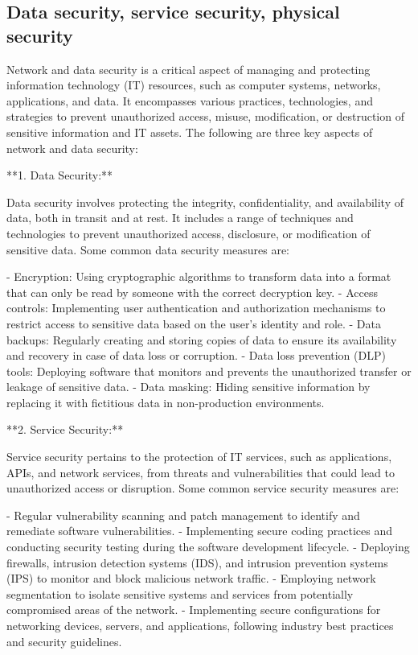 \documentclass{article}
\begin{document}
\subsection{Data security, service security, physical security}

Network and data security is a critical aspect of managing and protecting information technology (IT) resources, such as computer systems, networks, applications, and data. It encompasses various practices, technologies, and strategies to prevent unauthorized access, misuse, modification, or destruction of sensitive information and IT assets. The following are three key aspects of network and data security:

**1. Data Security:**

Data security involves protecting the integrity, confidentiality, and availability of data, both in transit and at rest. It includes a range of techniques and technologies to prevent unauthorized access, disclosure, or modification of sensitive data. Some common data security measures are:

- Encryption: Using cryptographic algorithms to transform data into a format that can only be read by someone with the correct decryption key.
- Access controls: Implementing user authentication and authorization mechanisms to restrict access to sensitive data based on the user's identity and role.
- Data backups: Regularly creating and storing copies of data to ensure its availability and recovery in case of data loss or corruption.
- Data loss prevention (DLP) tools: Deploying software that monitors and prevents the unauthorized transfer or leakage of sensitive data.
- Data masking: Hiding sensitive information by replacing it with fictitious data in non-production environments.

**2. Service Security:**

Service security pertains to the protection of IT services, such as applications, APIs, and network services, from threats and vulnerabilities that could lead to unauthorized access or disruption. Some common service security measures are:

- Regular vulnerability scanning and patch management to identify and remediate software vulnerabilities.
- Implementing secure coding practices and conducting security testing during the software development lifecycle.
- Deploying firewalls, intrusion detection systems (IDS), and intrusion prevention systems (IPS) to monitor and block malicious network traffic.
- Employing network segmentation to isolate sensitive systems and services from potentially compromised areas of the network.
- Implementing secure configurations for networking devices, servers, and applications, following industry best practices and security guidelines.
\end{document}
